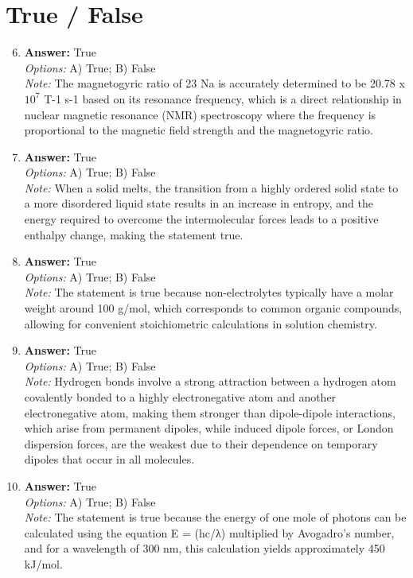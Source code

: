 \documentclass[12pt]{article}
\begin{document}
\section*{True / False}
\begin{enumerate}[label=\arabic*.]
\setcounter{enumi}{5}
\item \textbf{Answer:} True
\\ \textit{Options:} A) True; B) False
\\ \textit{Note:} The magnetogyric ratio of 23 Na is accurately determined to be 20.78 x $10^7$ T-1 s-1 based on its resonance frequency, which is a direct relationship in nuclear magnetic resonance (NMR) spectroscopy where the frequency is proportional to the magnetic field strength and the magnetogyric ratio.
\item \textbf{Answer:} True
\\ \textit{Options:} A) True; B) False
\\ \textit{Note:} When a solid melts, the transition from a highly ordered solid state to a more disordered liquid state results in an increase in entropy, and the energy required to overcome the intermolecular forces leads to a positive enthalpy change, making the statement true.
\item \textbf{Answer:} True
\\ \textit{Options:} A) True; B) False
\\ \textit{Note:} The statement is true because non-electrolytes typically have a molar weight around 100 g/mol, which corresponds to common organic compounds, allowing for convenient stoichiometric calculations in solution chemistry.
\item \textbf{Answer:} True
\\ \textit{Options:} A) True; B) False
\\ \textit{Note:} Hydrogen bonds involve a strong attraction between a hydrogen atom covalently bonded to a highly electronegative atom and another electronegative atom, making them stronger than dipole-dipole interactions, which arise from permanent dipoles, while induced dipole forces, or London dispersion forces, are the weakest due to their dependence on temporary dipoles that occur in all molecules.
\item \textbf{Answer:} True
\\ \textit{Options:} A) True; B) False
\\ \textit{Note:} The statement is true because the energy of one mole of photons can be calculated using the equation E = (hc/λ) multiplied by Avogadro's number, and for a wavelength of 300 nm, this calculation yields approximately 450 kJ/mol.
\end{enumerate}
\end{document}
